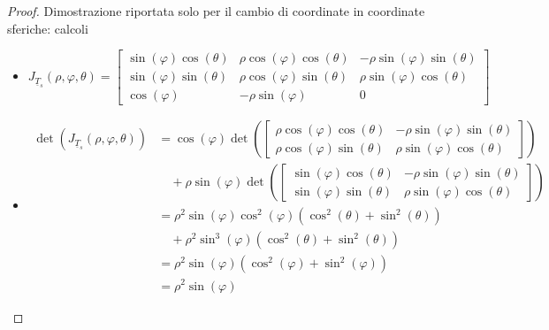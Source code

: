 \documentclass[12pt, a4paper]{article}
\theoremstyle{break}
\begin{document}
\begin{proof} Dimostrazione riportata solo per il cambio di coordinate in
	coordinate sferiche: calcoli
	\begin{itemize}
		\item
			\[
				J_{\underline{T}_s} (\rho, \varphi, \theta) =
				\begin{bmatrix}
					\sin(\varphi) \cos(\theta) & \rho \cos(\varphi) \cos(\theta)
					                           & -\rho \sin(\varphi)
					\sin(\theta)
					\\ \sin(\varphi) \sin(\theta)& \rho \cos(\varphi)
					\sin(\theta)               & \rho \sin(\varphi) \cos(\theta)
					\\ \cos(\varphi) & -\rho \sin(\varphi)              & 0
				\end{bmatrix}
			\]
		\item
			\begin{align*}
				 \det(J_{\underline{T}_s} (\rho, \varphi, \theta)) & =
				\cos(\varphi) \det \left(
				\begin{bmatrix}
						\rho \cos(\varphi) \cos(\theta) & -\rho \sin(\varphi)
						\sin(\theta)
						\\ \rho \cos(\varphi) \sin(\theta) & \rho \sin(\varphi)
						\cos(\theta)
					\end{bmatrix}
				\right)
				\\&\quad +
				\rho \sin(\varphi) \det \left(
				\begin{bmatrix}
						\sin(\varphi) \cos(\theta) & -\rho \sin(\varphi)
						\sin(\theta)
						\\ \sin(\varphi) \sin(\theta) & \rho \sin(\varphi)
						\cos(\theta)
					\end{bmatrix}
				\right)
			   \\ &= \rho^2 \sin(\varphi) \cos^2(\varphi)
				(\cos^2(\theta) + \sin^2(\theta)) 
				\\ &\quad + \rho^2 \sin^3(\varphi) (\cos^2(\theta) + \sin^2(\theta)) 
				\\ &= \rho^2 \sin(\varphi) (\cos^2(\varphi) + \sin^2(\varphi))
				\\ &= \rho^2 \sin(\varphi)
			\end{align*}
	\end{itemize}
\end{proof}
\end{document}

